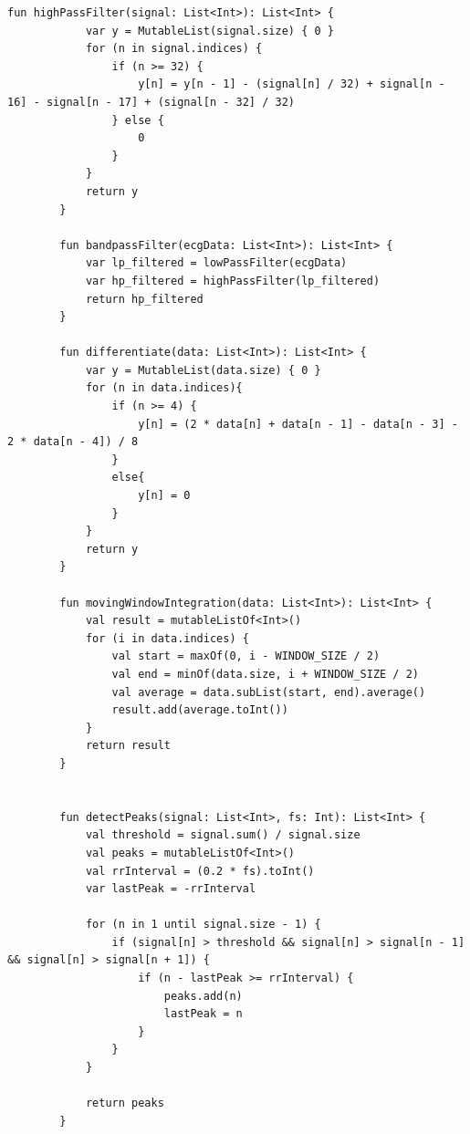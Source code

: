 {{\begin{lstlisting}[label={fig:simpleSourceGen.cs}, caption={Pan-Tompkins algorithm}]
		fun highPassFilter(signal: List<Int>): List<Int> {
			var y = MutableList(signal.size) { 0 }
			for (n in signal.indices) {
				if (n >= 32) {
					y[n] = y[n - 1] - (signal[n] / 32) + signal[n - 16] - signal[n - 17] + (signal[n - 32] / 32)
				} else {
					0
				}
			}
			return y
		}
	
		fun bandpassFilter(ecgData: List<Int>): List<Int> {
			var lp_filtered = lowPassFilter(ecgData)
			var hp_filtered = highPassFilter(lp_filtered)
			return hp_filtered 
		}
	
		fun differentiate(data: List<Int>): List<Int> {
			var y = MutableList(data.size) { 0 }
			for (n in data.indices){
				if (n >= 4) {
					y[n] = (2 * data[n] + data[n - 1] - data[n - 3] - 2 * data[n - 4]) / 8
				}
				else{
					y[n] = 0
				}
			}
			return y
		}
		
		fun movingWindowIntegration(data: List<Int>): List<Int> {
			val result = mutableListOf<Int>()
			for (i in data.indices) {
				val start = maxOf(0, i - WINDOW_SIZE / 2)
				val end = minOf(data.size, i + WINDOW_SIZE / 2)
				val average = data.subList(start, end).average()
				result.add(average.toInt())
			}
			return result
		}
		
		
		fun detectPeaks(signal: List<Int>, fs: Int): List<Int> {
			val threshold = signal.sum() / signal.size 
			val peaks = mutableListOf<Int>()
			val rrInterval = (0.2 * fs).toInt()  
			var lastPeak = -rrInterval
			
			for (n in 1 until signal.size - 1) {
				if (signal[n] > threshold && signal[n] > signal[n - 1] && signal[n] > signal[n + 1]) {
					if (n - lastPeak >= rrInterval) {
						peaks.add(n)
						lastPeak = n
					}
				}
			}
			
			return peaks
		}
			
		\end{lstlisting}
		\mbox{}\\
		\mbox{}\\
		\mbox{}\\
		\mbox{}\\
		\mbox{}\\
		\mbox{}\\
		\mbox{}\\
}}
